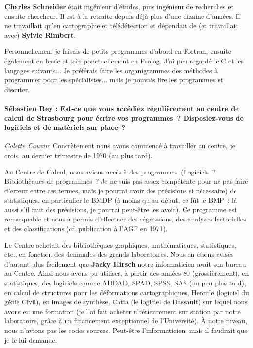 \textbf{Charles Schneider} était ingénieur d’études, puis ingénieur de recherches et ensuite chercheur. Il est à la retraite depuis déjà plus d’une dizaine d’années. Il ne travaillait qu’en cartographie et télédétection et dépendait de (et travaillait avec) \textbf{Sylvie Rimbert}. 

Personnellement je faisais de petits programmes d’abord en Fortran, ensuite également en basic et très ponctuellement en Prolog. J’ai peu regardé le C et les langages suivants... Je préférais faire les organigrammes des méthodes à programmer pour les spécialistes... mais je pouvais lire les programmes et discuter. 

\paragraph*{Sébastien Rey : Est-ce que vous accédiez régulièrement au centre de calcul de Strasbourg pour écrire vos programmes ? Disposiez-vous de logiciels et de matériels sur place ?}

\noindent\emph{Colette Cauvin}:  Concrètement nous avons commencé à travailler au centre, je crois, au dernier trimestre de 1970 (au plus tard). 

Au Centre de Calcul, nous avions accès à des programmes (Logiciels ? Bibliothèques de programmes ? Je ne suis pas assez compétente pour ne pas faire d’erreur entre ces termes, mais je pourrai avoir des précisions si nécessaire) de statistiques, en particulier le BMDP (à moins qu’au début, ce fût le BMP : là aussi s’il faut des précisions, je pourrai peut-être les avoir). Ce programme est remarquable et nous a permis d’effectuer des régressions, des analyses factorielles et des classifications (cf. publication à l’AGF en 1971).

Le Centre achetait des bibliothèques graphiques, mathématiques, statistiques, etc., en fonction des demandes des grands laboratoires. Nous en étions avisés d’autant plus facilement que \textbf{Jacky Hirsch} notre informaticien avait son bureau au Centre. Ainsi nous avons pu utiliser, à partir des années 80 (grossièrement), en statistiques, des logiciels comme ADDAD, SPAD, SPSS, SAS (un peu plus tard), en calcul de structures pour les déformations cartographiques, Hercule (logiciel du génie Civil), en images de synthèse, Catia (le logiciel de Dassault) sur lequel nous avons eu une formation (je l’ai fait acheter ultérieurement sur station par notre laboratoire, grâce à un financement exceptionnel de l’Université). À notre niveau, nous n’avions pas les codes sources. Peut-être l’informaticien, mais il faudrait que je le lui demande. 

